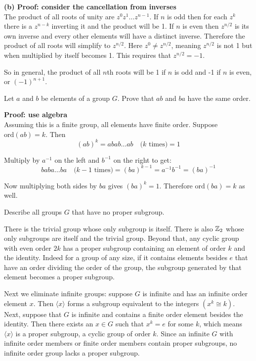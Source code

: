 \documentclass{article}
\begin{document}
\textbf{(b) Proof: consider the cancellation from inverses}
\\

The product of all roots of unity are $z^0 z^1 \ldots z^{n-1}$. If $n$ is odd then for each $z^k$ there is a $z^{n-k}$ inverting it and the product will be 1. If $n$ is even then $z^{n/2}$ is its own inverse and every other elements will have a distinct inverse. Therefore the product of all roots will simplify to $z^{n/2}$. Here $z^0 \neq z^{n/2}$, meaning $z^{n/2}$ is not 1 but when multiplied by itself becomes 1. This requires that $z^{n/2} = -1$.

So in general, the product of all $n$th roots will be 1 if $n$ is odd and -1 if $n$ is even, or $(-1)^{n+1}$.

\begin{problem}
Let $a$ and $b$ be elements of a group $G$. Prove that $ab$ and $ba$ have the same order.
\end{problem}

\textbf{Proof: use algebra}
\\

Assuming this is a finite group, all elements have finite order. Suppose $\text{ord}(ab) = k$. Then
$$(ab)^k = abab\ldots ab \quad \text{($k$ times)} = 1$$

Multiply by $a^{-1}$ on the left and $b^{-1}$ on the right to get:
$$baba\ldots ba \quad \text{($k-1$ times)} = (ba)^{k-1} = a^{-1}b^{-1} = (ba)^{-1}$$

Now multiplying both sides by $ba$ gives $(ba)^k = 1$. Therefore $\text{ord}(ba) = k$ as well.

\begin{problem}
Describe all groups $G$ that have no proper subgroup.
\end{problem}
There is the trivial group whose only subgroup is itself. There is also $\mathbb{Z}_2$ whose only subgroups are itself and the trivial group. Beyond that, any cyclic group with even order $2k$ has a proper subgroup containing an element of order $k$ and the identity. Indeed for a group of any size, if it contains elements besides $e$ that have an order dividing the order of the group, the subgroup generated by that element becomes a proper subgroup.

Next we eliminate infinite groups: suppose $G$ is infinite and has an infinite order element $x$. Then $\langle x \rangle$ forms a subgroup equivalent to the integers $(x^k \cong k)$. Next, suppose that $G$ is infinite and contains a finite order element besides the identity. Then there exists an $x \in G$ such that $x^k = e$ for some $k$, which means $\langle x \rangle$ is a proper subgroup, a cyclic group of order $k$. Since an infinite $G$ with infinite order members or finite order members contain proper subgroups, no infinite order group lacks a proper subgroup.
\end{document}
